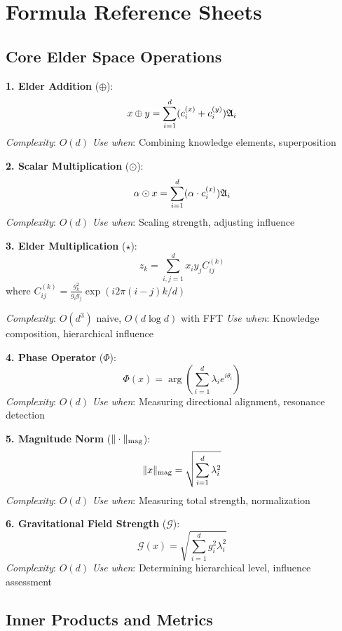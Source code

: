
\chapter{Formula Reference Sheets}

\section{Core Elder Space Operations}

\begin{tcolorbox}[colback=blue!5!white,colframe=blue!75!black,title=Fundamental Operations]

\textbf{1. Elder Addition} ($\oplus$):
$$x \oplus y = \sum_{i=1}^{d} (c_i^{(x)} + c_i^{(y)}) \mathfrak{A}_{i}$$
\textit{Complexity}: $O(d)$  
\textit{Use when}: Combining knowledge elements, superposition

\textbf{2. Scalar Multiplication} ($\odot$):
$$\alpha \odot x = \sum_{i=1}^{d} (\alpha \cdot c_i^{(x)}) \mathfrak{A}_{i}$$
\textit{Complexity}: $O(d)$  
\textit{Use when}: Scaling strength, adjusting influence

\textbf{3. Elder Multiplication} ($\star$):
$$z_k = \sum_{i,j=1}^{d} x_i y_j C_{ij}^{(k)}$$
where $C_{ij}^{(k)} = \frac{g_k^2}{g_ig_j} \exp(i2\pi(i-j)k/d)$

\textit{Complexity}: $O(d^3)$ naive, $O(d \log d)$ with FFT  
\textit{Use when}: Knowledge composition, hierarchical influence

\textbf{4. Phase Operator} ($\Phi$):
$$\Phi(x) = \arg\left(\sum_{i=1}^{d} \lambda_i e^{i\theta_i}\right)$$
\textit{Complexity}: $O(d)$  
\textit{Use when}: Measuring directional alignment, resonance detection

\textbf{5. Magnitude Norm} ($\|\cdot\|_{\text{mag}}$):
$$\|x\|_{\text{mag}} = \sqrt{\sum_{i=1}^{d} \lambda_i^2}$$
\textit{Complexity}: $O(d)$  
\textit{Use when}: Measuring total strength, normalization

\textbf{6. Gravitational Field Strength} ($\mathcal{G}$):
$$\mathcal{G}(x) = \sqrt{\sum_{i=1}^{d} g_i^2 \lambda_i^2}$$
\textit{Complexity}: $O(d)$  
\textit{Use when}: Determining hierarchical level, influence assessment

\end{tcolorbox}

\section{Inner Products and Metrics}

